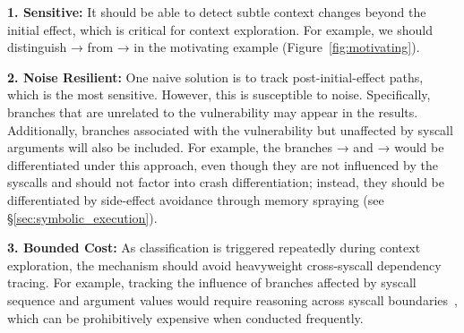 \noindent\textbf{1. Sensitive:} It should be able to detect subtle context changes beyond the initial effect, which is critical for context exploration. For example, we should distinguish → from → in the motivating example (Figure~\ref{fig:motivating}).

\noindent\textbf{2. Noise Resilient:} One naive solution is to track post-initial-effect paths, which is the most sensitive.
However, this is susceptible to noise. Specifically, branches that are unrelated to the vulnerability may appear in the results. Additionally, branches associated with the vulnerability but unaffected by syscall arguments will also be included.
For example, the branches → and → would be differentiated under this approach, even though they are not influenced by the syscalls and should not factor into crash differentiation; instead, they should be differentiated by side-effect avoidance through memory spraying (see \S\ref{sec:symbolic_execution}).


\noindent\textbf{3. Bounded Cost:} As classification is triggered repeatedly during context exploration, the mechanism should avoid heavyweight cross-syscall dependency tracing. For example, tracking the influence of branches affected by syscall sequence and argument values would require reasoning across syscall boundaries~\cite{dependency_measurement}, which can be prohibitively expensive when conducted frequently. 






